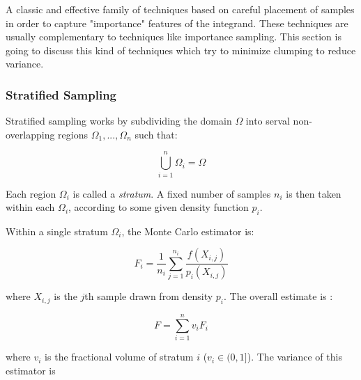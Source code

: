 A classic and effective family of techniques based on careful placement of samples in order to capture "importance" features of the integrand. These techniques are usually complementary to techniques like importance sampling. This section is going to discuss this kind of techniques which try to minimize clumping to reduce variance.


\subsubsection{Stratified Sampling}
Stratified sampling works by subdividing the domain $\Omega$ into serval non-overlapping regions $\Omega_1,...,\Omega_n$ such that:

\begin{equation}
	\bigcup_{i=1}^{n}\Omega_i=\Omega
\end{equation}

Each region $\Omega_i$ is called a \textit{stratum}. A fixed number of samples $n_i$ is then taken within each $\Omega_i$, according to some given density function $p_i$.

Within a single stratum $\Omega_i$, the Monte Carlo estimator is:

\begin{equation}
	F_i=\frac{1}{n_i}\sum_{j=1}^{n_i}\frac{f(X_{i,j})}{p_i(X_{i,j})}
\end{equation} 

where $X_{i,j}$ is the $j$th sample drawn from density $p_i$. The overall estimate is :

\begin{equation}
	F=\sum_{i=1}^{n}v_iF_i
\end{equation}

where $v_i$ is the fractional volume of stratum $i$ ($v_i\in(0,1]$). The variance of this estimator is 

